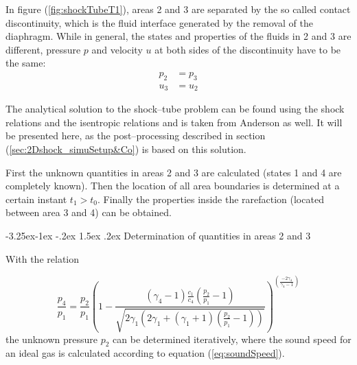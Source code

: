\documentclass{report}
\makeatletter
\renewcommand\paragraph{\@startsection{paragraph}{4}{\z@}%
  {-3.25ex\@plus -1ex \@minus -.2ex}%
  {1.5ex \@plus .2ex}%
  {\normalfont\normalsize\bfseries}}
\makeatother
\begin{document}
%             
%       

In figure (\ref{fig:shockTubeT1}), areas 2 and 3 are separated by the so called contact discontinuity, which is the fluid interface generated by the removal of the diaphragm. While in general, the states and properties of the fluids in 2 and 3 are different, pressure $p$ and velocity $u$ at both sides of the discontinuity have to be the same:
\begin{equation}
\begin{split}
\label{eq:condCD}
p_2&=p_3\\
u_3&=u_2
\end{split}
\end{equation}

The analytical solution to the shock--tube problem can be found using the shock relations and the isentropic relations and is taken from Anderson \cite{Anderson2002} as well. 
It will be presented here, as the post--processing described in section (\ref{sec:2Dshock_simuSetup&Co}) is based on this solution.

First the unknown quantities in areas 2 and 3 are calculated (states 1 and 4 are completely known). Then the location of all area boundaries is determined at a certain instant $t_1>t_0$. Finally the properties inside the rarefaction (located between area 3 and 4) can be obtained.

\paragraph{Determination of quantities in areas 2 and 3}

With the relation

\begin{equation}
 \frac{p_4}{p_1} = \frac{p_2}{p_1}  \left(1-\frac{(\gamma_4-1)\frac{c_1}{c_4}\left(\frac{p_2}{p_1}-1\right)}{\sqrt{2\gamma_1\left(2 \gamma_1+(\gamma_1+1)\left(\frac{p_2}{p_1}-1\right)\right)}}\right)^{\left(\frac{-2 \gamma_4}{\gamma_4-1}\right)}
\end{equation}
the unknown pressure $p_2$ can be determined iteratively, where the sound speed for an ideal gas is calculated according to equation (\ref{eq:soundSpeed}). 
\end{document}
